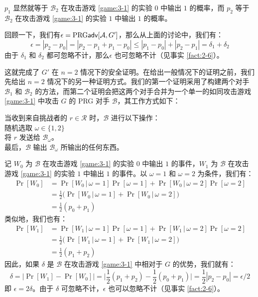 \vspace*{5pt}

\noindent
$p_1$ 显然就等于 $\mathcal B_2$ 在攻击游戏 \ref{game:3-1} 的实验 $0$ 中输出 $1$ 的概率，而 $p_2$ 等于 $\mathcal B_2$ 在攻击游戏 \ref{game:3-1} 的实验 $1$ 中输出 $1$ 的概率。

回顾一下，我们有$\epsilon={\rm PRG\mathsf{adv}}[\mathcal{A},G']$，那么从上面的讨论中，我们有：
\[
\epsilon=|p_2-p_0|=|p_2-p_1+p_1-p_0|\leq|p_1-p_0|+|p_2-p_1|=\delta_1+\delta_2
\]
由于 $\delta_1$ 和 $\delta_2$ 都可忽略不计，那么$\epsilon$ 也可忽略不计（见事实 \ref{fact:2-6}）。

这就完成了 $G'$ 在 $n=2$ 情况下的安全证明。在给出一般情况下的证明之前，我们先给出 $n=2$ 情况下的另一种证明方式。我们的第一个证明采用了构建两个对手 $\mathcal B_1$ 和 $\mathcal B_2$ 的方法，而第二个证明会把这两个对手合并为一个单一的如同攻击游戏 \ref{game:3-1} 中攻击 $G$ 的 PRG 对手 $\mathcal B$，其工作方式如下：

\vspace*{5pt}

\hspace*{5pt} 当收到来自挑战者的 $r\in\mathcal R$ 时，$\mathcal B$ 进行以下操作：\\
\hspace*{50pt} 随机选取 $\omega\in\{1,2\}$\\
\hspace*{50pt} 将 $r$ 发送给 $\mathcal B_\omega$。\\
\hspace*{26pt} 最后，$\mathcal B$ 输出 $\mathcal B_\omega$ 所输出的任何东西。

\vspace*{5pt}

记 $W_0$ 为 $\mathcal B$ 在攻击游戏 \ref{game:3-1} 的实验 $0$ 中输出 $1$ 的事件，$W_1$ 为 $\mathcal B$ 在攻击游戏 \ref{game:3-1} 的实验 $1$ 中输出 $1$ 的事件。以 $\omega=1$ 和 $\omega=2$ 为条件，我们有：
\[
\begin{aligned}
\Pr[W_0]
&=\Pr[W_0\,|\,\omega=1]\Pr[\omega=1]+\Pr[W_0\,|\,\omega=2]\Pr[\omega=2]\\
&=\frac{1}{2}\Big(\Pr[W_0\,|\,\omega=1]+\Pr[W_0\,|\,\omega=2]\Big)\\
&=\frac{1}{2}(p_0+p_1)
\end{aligned}
\]
类似地，我们也有：
\[
\begin{aligned}
\Pr[W_1]
&=\Pr[W_1\,|\,\omega=1]\Pr[\omega=1]+\Pr[W_1\,|\,\omega=2]\Pr[\omega=2]\\
&=\frac{1}{2}\Big(\Pr[W_1\,|\,\omega=1]+\Pr[W_1\,|\,\omega=2]\Big)\\
&=\frac{1}{2}(p_1+p_2)
\end{aligned}
\]
因此，如果 $\delta$ 是 $\mathcal B$ 在攻击游戏 \ref{game:3-1} 中相对于 $G$ 的优势，我们就有：
\[
\delta=\big\lvert\Pr[W_1]-\Pr[W_0]\big\rvert
=\bigg\lvert\frac{1}{2}(p_1+p_2)-\frac{1}{2}(p_0+p_1)\bigg\lvert
=\frac{1}{2}|p_2-p_0|
={\epsilon}/{2}
\]
即 $\epsilon=2\delta$。由于 $\delta$ 可忽略不计，$\epsilon$ 也可以忽略不计（见事实 \ref{fact:2-6}）。

